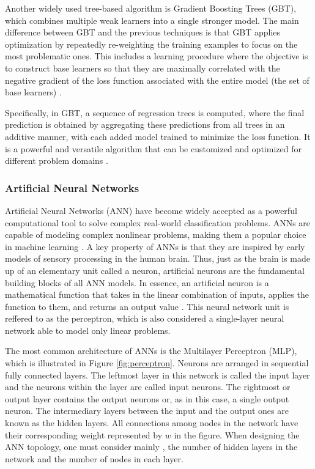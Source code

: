 Another widely used tree-based algorithm is Gradient Boosting Trees (GBT), which combines multiple weak learners into a single stronger model. The main difference between GBT and the previous techniques is that GBT applies optimization by repeatedly re-weighting the training examples to focus on the most problematic ones. This includes a learning procedure where the objective is to construct base learners so that they are maximally correlated with the negative gradient of the loss function associated with the entire model (\ie the set of base learners) \cite{sagi2018ensemble}.

Specifically, in GBT, a sequence of regression trees is computed, where the final prediction is obtained by aggregating these predictions from all trees in an additive manner, with each added model trained to minimize the loss function. It is a powerful and versatile algorithm that can be customized and optimized for different problem domains \cite{kingsford2008decision}.


\subsubsection{Artificial Neural Networks}

Artificial Neural Networks (ANN) have become widely accepted as a powerful computational tool to solve complex real-world classification problems. ANNs are capable of modeling complex nonlinear problems, making them a popular choice in machine learning \cite{zou2009overview}. A key property of ANNs is that they are inspired by early models of sensory processing in the human brain. Thus, just as the brain is made up of an elementary unit called a neuron, artificial neurons are the fundamental building blocks of all ANN models. In essence, an artificial neuron is a mathematical function that takes in the linear combination of inputs, applies the function to them, and returns an output value \cite{krogh2008artificial}. This neural network unit is reffered to as the perceptron, which is also considered a single-layer neural network able to model only linear problems. 

The most common architecture of ANNs is the Multilayer Perceptron (MLP), which is illustrated in Figure \ref{fig:perceptron}. Neurons are arranged in sequential fully connected layers. The leftmost layer in this network is called the input layer and the neurons within the layer are called input neurons. The rightmost or output layer contains the output neurons or, as in this case, a single output neuron. The intermediary layers between the input and the output ones are known as the hidden layers. All connections among nodes in the network have their corresponding weight represented by $w$ in the figure. When designing the ANN topology, one must consider mainly , the number of hidden layers in the network and the number of nodes in each layer.


